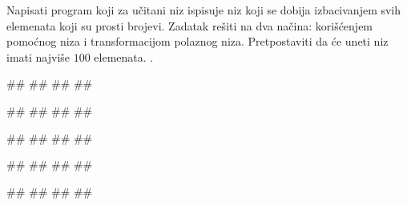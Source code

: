 \begin{Exercise}[label=p.izbacivanje_prostih_elemenata] 
Napisati program koji za učitani niz ispisuje niz koji se dobija izbacivanjem svih elemenata koji su prosti brojevi. Zadatak rešiti na dva načina: korišćenjem pomoćnog niza i transformacijom polaznog niza. %
Pretpostaviti da će uneti niz imati najviše $100$ elemenata. 
. 

 
\begin{miditest}
\begin{upotreba}{1}
#\naslovInt#
##
##
##
\end{upotreba}
\end{miditest}
\begin{miditest}
\begin{upotreba}{2}
#\naslovInt#
##
##
##
\end{upotreba}
\end{miditest}

\begin{miditest}
\begin{upotreba}{3}
#\naslovInt#
##
##
##
\end{upotreba}
\end{miditest}
\begin{miditest}
\begin{upotreba}{4}
#\naslovInt#
##
##
#\izlaz{}#
\end{upotreba}
\end{miditest}

\begin{miditest}
\begin{upotreba}{5}
#\naslovInt#
##
##
##
\end{upotreba}
\end{miditest}
\end{Exercise}
\begin{Answer}[ref=p.izbacivanje_prostih_elemenata]
\end{Answer}


